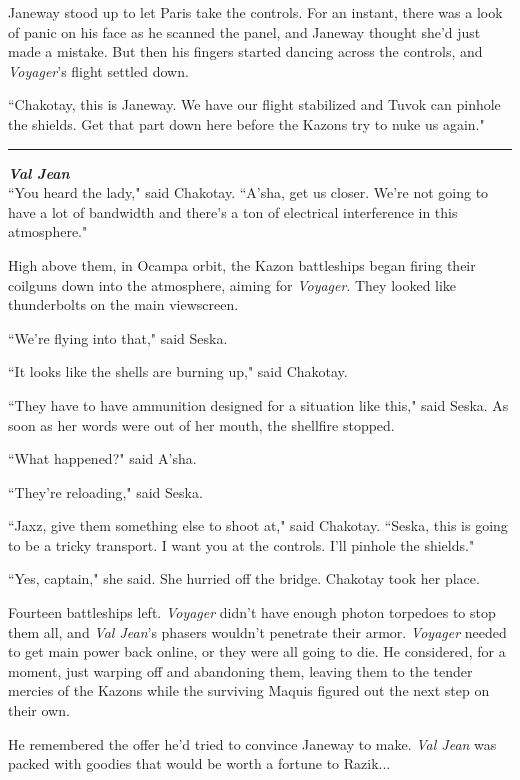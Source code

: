 \documentclass[twoside,letterpaper,12pt]{memoir}
\begin{document}
Janeway stood up to let Paris take the controls. For an instant, there was a look of panic on his face as he scanned the panel, and Janeway thought she'd just made a mistake. But then his fingers started dancing across the controls, and \textit{Voyager}'s flight settled down.

``Chakotay, this is Janeway. We have our flight stabilized and Tuvok can pinhole the shields. Get that part down here before the Kazons try to nuke us again."

\begin{center}\rule{3cm}{0.4 pt}\end{center}

\noindent\textit{\textbf{Val Jean}}\\

``You heard the lady," said Chakotay. ``A'sha, get us closer. We're not going to have a lot of bandwidth and there's a ton of electrical interference in this atmosphere."

High above them, in Ocampa orbit, the Kazon battleships began firing their coilguns down into the atmosphere, aiming for \textit{Voyager}. They looked like thunderbolts on the main viewscreen.

``We're flying into that," said Seska.

``It looks like the shells are burning up," said Chakotay.

``They have to have ammunition designed for a situation like this," said Seska. As soon as her words were out of her mouth, the shellfire stopped.

``What happened?" said A'sha.

``They're reloading," said Seska.

``Jaxz, give them something else to shoot at," said Chakotay. ``Seska, this is going to be a tricky transport. I want you at the controls. I'll pinhole the shields."

``Yes, captain," she said. She hurried off the bridge. Chakotay took her place.

Fourteen battleships left. \textit{Voyager} didn't have enough photon torpedoes to stop them all, and \textit{Val Jean}'s phasers wouldn't penetrate their armor. \textit{Voyager} needed to get main power back online, or they were all going to die. He considered, for a moment, just warping off and abandoning them, leaving them to the tender mercies of the Kazons while the surviving Maquis figured out the next step on their own.

He remembered the offer he'd tried to convince Janeway to make. \textit{Val Jean} was packed with goodies that would be worth a fortune to Razik...
\end{document}
